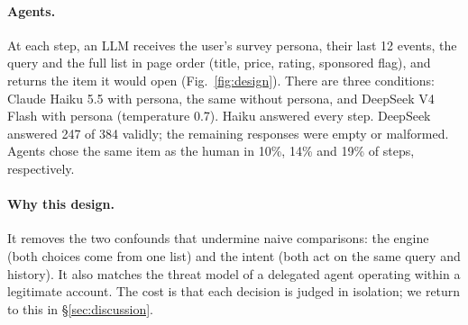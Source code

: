 \paragraph{Agents.} At each step, an LLM receives the user's survey persona, their last 12 events, the query and the full list in page order (title, price, rating, sponsored flag), and returns the item it would open (Fig.~\ref{fig:design}). There are three conditions: Claude Haiku 5.5 with persona, the same without persona, and DeepSeek V4 Flash with persona (temperature 0.7). Haiku answered every step. DeepSeek answered 247 of 384 validly; the remaining responses were empty or malformed. Agents chose the same item as the human in 10\%, 14\% and 19\% of steps, respectively.

\paragraph{Why this design.} It removes the two confounds that undermine naive comparisons: the engine (both choices come from one list) and the intent (both act on the same query and history). It also matches the threat model of a delegated agent operating within a legitimate account. The cost is that each decision is judged in isolation; we return to this in \S\ref{sec:discussion}.
